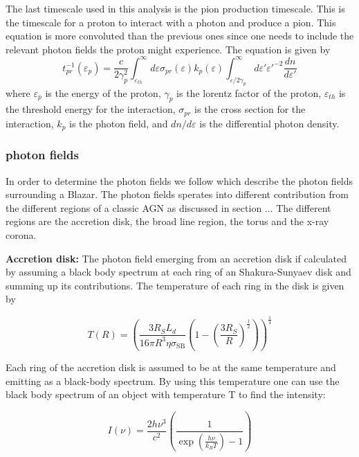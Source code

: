 The last timescale used in this analysis is the pion production timescale. This is the timescale for a proton to interact with a photon and produce a pion. This equation is more convoluted than 
the previous ones since one needs to include the relevant photon fields the proton might experience. The equation is given by
\begin{equation}
    t_{pr}^{-1}(\varepsilon_p) = \frac{c}{2\gamma_p^2} \int_{\varepsilon_{th}}^{\infty} d\varepsilon \sigma_{pr}(\varepsilon) k_p(\varepsilon) \int_{\varepsilon/2\gamma_p}^{\infty} d\varepsilon' \varepsilon'^{-2} \frac{dn}{d\varepsilon'}
\end{equation}
where $\varepsilon_p$ is the energy of the proton, $\gamma_p$ is the lorentz factor of the proton, $\varepsilon_{th}$ is the threshold energy for the interaction, $\sigma_{pr}$ is the cross section for the interaction, $k_p$ is the photon field, and $dn/d\varepsilon$ is the differential photon density.

\subsubsection{photon fields}
In order to determine the photon fields we follow \cite{Ghisellini_2009} which describe the photon fields surrounding a Blazar. The photon fields sperates into different contribution from the different regions of a classic AGN as discussed in section ... 
The different regions are the accretion disk, the broad line region, the torus and the x-ray corona. 


\textbf{Accretion disk:} The photon field emerging from an accretion disk if calculated by assuming a black body spectrum at each ring of an Shakura-Sunyaev disk and summing up its contributions. The temperature of 
each ring in the disk is given by 

\begin{equation}
    T(R) = \left(\frac{3 R_{S} L_{d}}{16 \pi R^3 \eta \sigma_{\mathrm{SB}}} \left(1-\left(\frac{3 R_{S}}{R}\right)^{\frac{1}{2}}\right) \right)^{\frac{1}{4}}
\end{equation}

Each ring of the accretion disk is assumed to be at the same temperature and emitting as a black-body spectrum. By using this temperature one can use the black body spectrum of an object with temperature T to find the intensity:

\begin{equation}
    \label{eq:BB}
    I(\nu) = \frac{2 h \nu^3}{c^2} \left(\frac{1}{\exp\left(\frac{h \nu}{k_B T}\right) - 1}\right)
\end{equation}

